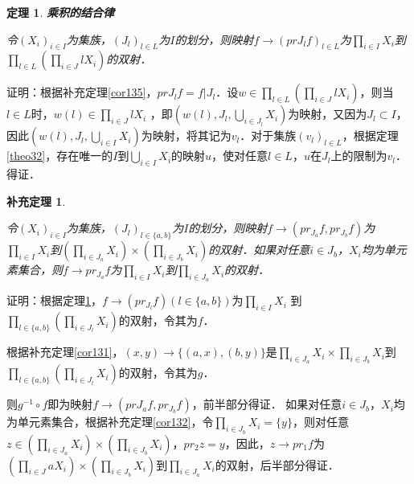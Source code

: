 \documentclass[12pt, a4paper, oneside]{book}
\newtheorem{theo}{定理}
\newtheorem{cor}{补充定理}
\begin{document}
			\begin{theo}\label{theo46}
				\textbf{乘积的结合律}
				\par
				令$(X_i)_{i\in I}$为集族，$(J_l)_{l\in L}$为$I$的划分，则映射$f\to (prJ_lf)_{l\in L}$为$\prod\limits_{i\in I}X_i$到$\prod\limits_{l\in L}(\prod\limits_{i\in J}lX_i)$的双射．
			\end{theo}
			证明：根据补充定理\ref{cor135}，$prJ_lf=f|J_l$．设$w\in \prod\limits_{l\in L}(\prod\limits_{i\in J}lX_i )$，则当$l\in L$时，$w(l)\in \prod\limits_{i\in J}lX_i$ ，即$(w(l), J_l, \bigcup\limits_{i\in J_l}X_i)$为映射，又因为$J_l\subset I$，因此$(w(l), J_l, \bigcup\limits_{i\in I}X_i)$为映射，将其记为$v_l$．对于集族$(v_l)_{l\in L}$，根据定理\ref{theo32}，存在唯一的$I$到$\bigcup\limits_{i\in I}X_i$的映射$u$，使对任意$l\in L$，$u$在$J_l$上的限制为$v_l$．得证．
			
			\begin{cor}\label{cor138}
				\hfill\par
				令$(X_i)_{i\in I}$为集族，$(J_l)_{l\in \{a, b\}}$为$I$的划分，则映射$f\to (pr_{J_a}f, pr_{J_b}f)$为$\prod\limits_{i\in I}X_i$到$(\prod\limits_{i\in J_a}X_i)\times (\prod\limits_{i\in J_b}X_i)$的双射．如果对任意$i\in J_b$，$X_i$均为单元素集合，则$f\to pr_{J_a}f$为$\prod\limits_{i\in I}X_i$到$\prod\limits_{i\in J_a}X_i$的双射．
			\end{cor}
			证明：根据定理\ref{theo46}，$f\to (pr_{J_l}f)(l\in \{a, b\})$为$\prod\limits_{i\in I}X_i$ 到$\prod\limits_{l\in \{a, b\}}(\prod\limits_{i\in J_l}X_i)$的双射，令其为$f$．
			\par
			根据补充定理\ref{cor131}，$(x, y)\to \{(a, x), (b, y)\}$是$\prod\limits_{i\in J_a}X_i\times \prod\limits_{i\in J_b}X_i$到$\prod\limits_{l\in \{a, b\}}(\prod\limits_{i\in J_l}X_i)$的双射，令其为$g$．
			\par
			则$g^{-1}\circ f$即为映射$f\to (pr{J_a}f, pr_{J_b}f)$，前半部分得证．
			如果对任意$i\in J_b$，$X_i$均为单元素集合，根据补充定理\ref{cor132}，令$\prod\limits_{i\in J_b}X_i=\{y\}$，则对任意$z\in (\prod\limits_{i\in J_a}X_i)\times (\prod\limits_{i\in J_b}X_i)$，$pr_2z=y$，因此，$z\to pr_1f$为$(\prod\limits_{i\in J}aX_i)\times (\prod\limits_{i\in J_b}X_i)$到$\prod\limits_{i\in J_a}X_i$的双射，后半部分得证．
			
\end{document}
